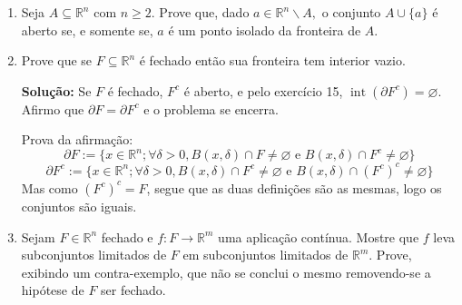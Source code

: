 \documentclass[12pt]{article}
\newcommand{\emp}{\varnothing}
\newcommand{\rn}{\mathbb{R}^n}
\newcommand{\op}[1]{\operatorname{#1}}
\begin{document}
\begin{enumerate}
Suponha, por absurdo que $\op{int}(\partial A)\neq\emp$, assim, $\exists y\in\rn$ tal que $y\in\op{int}(\partial A)$ i.e, para tal $y$, $\exists\delta_y>0$ onde $B(y,\delta_y)\subseteq\partial A$.

Se toda a bola está em $\partial A$, então, em particular $y\in\partial A$, ou seja, temos $B(y,\delta_y)\cap A\neq \emp$. Tome então $x\in B(y,\delta_y)\cap A$. em particular $x\in A$ aberto, logo existe uma bola $B(x,\delta_x)\subseteq A$, e podemos tomar $\delta_x$ suficientemente pequeno de tal forma que $B(x,\delta_x)$ também pertença a $B(y,\delta_y)$\footnote{já que $B(y,\delta_y)$ é aberto.}. Com isso $B(x,\delta_x)$ pertencerá a fronteira $\partial A$, assim $B(y,\delta_y)\cap A^c\neq \emp$, o que contradiz o fato de $B(x,\delta_x)$ estar inteiramente contido em $A$.

\item Seja $A\subseteq \mathbb{R}^n$ com $n\geq 2.$ Prove que, dado $a\in \mathbb{R}^n\backslash A,$ o conjunto $A \cup \{a\}$ \'e aberto se, e somente se, $a$ \'e um ponto isolado da fronteira de $A.$ 

\item Prove que se $F\subseteq\mathbb{R}^n$ \'e fechado ent\~ao sua fronteira tem interior vazio.

\textbf{Solução:} Se $F$ é fechado, $F^c$ é aberto, e pelo exercício 15, $\op{int}(\partial F^c)=\emp$. Afirmo que $\partial F = \partial F^c$ e o problema se encerra.

Prova da afirmação: 
$$\partial F :=\{x\in\rn;\forall\delta>0,B(x,\delta)\cap F\neq\emp\text{ e }B(x,\delta)\cap F^c\neq\emp\}$$
$$\partial F^c:=\{x\in\rn;\forall\delta>0,B(x,\delta)\cap F^c\neq\emp\text{ e }B(x,\delta)\cap (F^c)^c\neq\emp\}$$
Mas como $(F^c)^c=F$, segue que as duas definições são as mesmas, logo os conjuntos são iguais.



\item Sejam $F \in \mathbb{R}^n$ fechado e $f : F \rightarrow \mathbb{R}^m$ uma aplicação contínua. Mostre que $f$ leva subconjuntos limitados de $F$ em subconjuntos limitados de $\mathbb{R}^m$. Prove, exibindo um contra-exemplo, que não se conclui o mesmo removendo-se a hipótese de $F$ ser fechado.


\end{enumerate}
\end{document}
